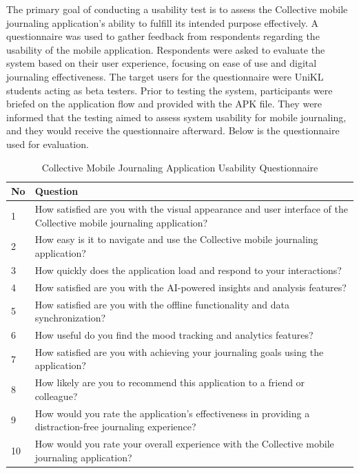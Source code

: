 The primary goal of conducting a usability test is to assess the Collective mobile journaling application's ability to fulfill its intended purpose effectively. A questionnaire was used to gather feedback from respondents regarding the usability of the mobile application. Respondents were asked to evaluate the system based on their user experience, focusing on ease of use and digital journaling effectiveness. The target users for the questionnaire were UniKL students acting as beta testers. Prior to testing the system, participants were briefed on the application flow and provided with the APK file. They were informed that the testing aimed to assess system usability for mobile journaling, and they would receive the questionnaire afterward. Below is the questionnaire used for evaluation.

\begin{table}[H]
\centering
\caption{Collective Mobile Journaling Application Usability Questionnaire}
\label{tab:usability-questionnaire}
\begin{tabular}{|p{1.5cm}|p{12.5cm}|}
\hline
\textbf{No} & \textbf{Question} \\
\hline
1 & How satisfied are you with the visual appearance and user interface of the Collective mobile journaling application? \\
\hline
2 & How easy is it to navigate and use the Collective mobile journaling application? \\
\hline
3 & How quickly does the application load and respond to your interactions? \\
\hline
4 & How satisfied are you with the AI-powered insights and analysis features? \\
\hline
5 & How satisfied are you with the offline functionality and data synchronization? \\
\hline
6 & How useful do you find the mood tracking and analytics features? \\
\hline
7 & How satisfied are you with achieving your journaling goals using the application? \\
\hline
8 & How likely are you to recommend this application to a friend or colleague? \\
\hline
9 & How would you rate the application's effectiveness in providing a distraction-free journaling experience? \\
\hline
10 & How would you rate your overall experience with the Collective mobile journaling application? \\
\hline
\end{tabular}
\end{table}


